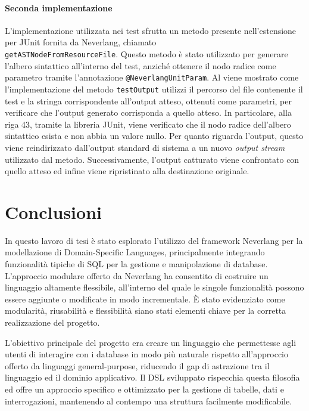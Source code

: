 \documentclass[12pt,a4paper,openright,twoside]{book}
\begin{document}
\paragraph{Seconda implementazione}
L’implementazione utilizzata nei test sfrutta un metodo presente nell'estensione per JUnit fornita da Neverlang, chiamato\\
\texttt{getASTNodeFromResourceFile}. Questo metodo è stato utilizzato per generare l’albero sintattico all’interno del test, anziché 
ottenere il nodo radice come parametro tramite l’annotazione \texttt{@NeverlangUnitParam}. Al  viene mostrato 
come l’implementazione del metodo \texttt{testOutput} utilizzi il percorso del file contenente il test e la stringa corrispondente 
all’output atteso, ottenuti come parametri, per verificare che l’output generato corrisponda a quello atteso. In particolare, alla 
riga 43, tramite la libreria JUnit, viene verificato che il nodo radice dell’albero sintattico esista e non abbia un valore nullo. 
Per quanto riguarda l’output, questo viene reindirizzato dall’output standard di sistema a un nuovo \textit{output stream} utilizzato 
dal metodo. Successivamente, l’output catturato viene confrontato con quello atteso ed infine viene ripristinato alla 
destinazione originale.



\newpage
\section{Conclusioni}
In questo lavoro di tesi è stato esplorato l’utilizzo del framework Neverlang per la modellazione di Domain-Specific Languages, 
principalmente integrando funzionalità tipiche di SQL per la gestione e manipolazione di database. L’approccio modulare offerto 
da Neverlang ha consentito di costruire un linguaggio altamente flessibile, all’interno del quale le singole funzionalità possono 
essere aggiunte o modificate in modo incrementale. È stato evidenziato come modularità, riusabilità e flessibilità siano stati 
elementi chiave per la corretta realizzazione del progetto.

L’obiettivo principale del progetto era creare un linguaggio che permettesse agli utenti di interagire con i database in modo più 
naturale rispetto all’approccio offerto da linguaggi general-purpose, riducendo il gap di astrazione tra il linguaggio ed il 
dominio applicativo. Il DSL sviluppato rispecchia questa filosofia ed offre un approccio specifico e ottimizzato per la gestione 
di tabelle, dati e interrogazioni, mantenendo al contempo una struttura facilmente modificabile.
\end{document}
